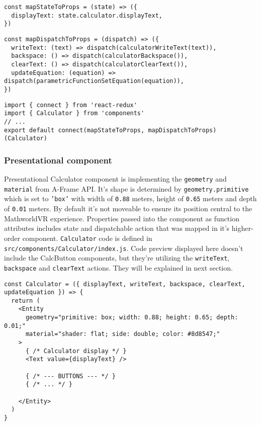 \begin{lstlisting}[caption={Function to map \texttt{calculator} state to component properties.},captionpos=b]
const mapStateToProps = (state) => ({
  displayText: state.calculator.displayText,
})
\end{lstlisting}

\begin{lstlisting}[caption={Function to map dispatchable \texttt{calculator} action creators to component properties.},captionpos=b]
const mapDispatchToProps = (dispatch) => ({
  writeText: (text) => dispatch(calculatorWriteText(text)),
  backspace: () => dispatch(calculatorBackspace()),
  clearText: () => dispatch(calculatorClearText()),
  updateEquation: (equation) => dispatch(parametricFunctionSetEquation(equation)),
})
\end{lstlisting}

\begin{lstlisting}[caption={Creation of \texttt{Calculator} higher-order component.},captionpos=b]
import { connect } from 'react-redux'
import { Calculator } from 'components'
// ...
export default connect(mapStateToProps, mapDispatchToProps)(Calculator)
\end{lstlisting}

\subsubsection{Presentational component}
Presentational Calculator component is implementing the \texttt{geometry} and \texttt{material} from A-Frame API. It's shape is determined by \texttt{geometry.primitive} which is set to \texttt{'box'} with width of \texttt{0.88} meters, height of \texttt{0.65} meters and depth of \texttt{0.01} meters. By default it's not moveable to ensure its position central to the MathworldVR experience. Properties passed into the component as function attributes includes state and dispatchable action that was mapped in it's higher-order component. \texttt{Calculator} code is defined in \texttt{src/components/Calculator/index.js}. Code preview displayed here doesn't include the CalcButton components, but they're utilizing the \texttt{writeText}, \texttt{backspace} and \texttt{clearText} actions. They will be explained in next section.

\begin{lstlisting}[caption={Presentational \texttt{Calculator} component code.},captionpos=b]
const Calculator = ({ displayText, writeText, backspace, clearText, updateEquation }) => {
  return (
    <Entity
      geometry="primitive: box; width: 0.88; height: 0.65; depth: 0.01;"
      material="shader: flat; side: double; color: #8d8547;"
    >
      { /* Calculator display */ }
      <Text value={displayText} />
      
      { /* --- BUTTONS --- */ }
      { /* ... */ }
      
    </Entity>
  )
}
      
\end{lstlisting}


